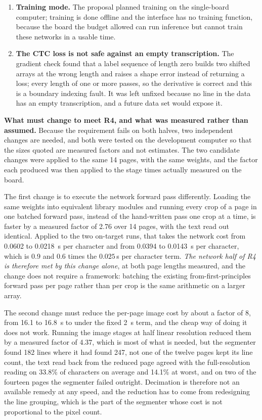 \begin{enumerate}
          \item \textbf{Training mode.} The proposal planned training on the single-board computer; training is done offline and the interface has no training function, because the board the budget allowed can run inference but cannot train these networks in a usable time.
          \item \textbf{The CTC loss is not safe against an empty transcription.} The gradient check found that a label sequence of length zero builds two shifted arrays at the wrong length and raises a shape error instead of returning a loss; every length of one or more passes, so the derivative is correct and this is a boundary indexing fault. It was left unfixed because no line in the data has an empty transcription, and a future data set would expose it.
        \end{enumerate}

        \textbf{What must change to meet R4, and what was measured rather than assumed.}
        Because the requirement fails on both halves, two independent changes are needed, and both were tested on the development computer so that the sizes quoted are measured factors and not estimates.
        The two candidate changes were applied to the same 14 pages, with the same weights, and the factor each produced was then applied to the stage times actually measured on the board.

        The first change is to execute the network forward pass differently.
        Loading the same weights into equivalent library modules and running every crop of a page in one batched forward pass, instead of the hand-written pass one crop at a time, is faster by a measured factor of 2.76 over 14 pages, with the text read out identical.
        Applied to the two on-target runs, that takes the network cost from 0.0602 to 0.0218~s per character and from 0.0394 to 0.0143~s per character, which is 0.9 and 0.6 times the $0.025\,$s per character term.
        \emph{The network half of R4 is therefore met by this change alone}, at both page lengths measured, and the change does not require a framework: batching the existing from-first-principles forward pass per page rather than per crop is the same arithmetic on a larger array.

        The second change must reduce the per-page image cost by about a factor of 8, from 16.1 to 16.8~s to under the fixed 2~s term, and the cheap way of doing it does not work.
        Running the image stages at half linear resolution reduced them by a measured factor of 4.37, which is most of what is needed, but the segmenter found 182 lines where it had found 247, not one of the twelve pages kept its line count, the text read back from the reduced page agreed with the full-resolution reading on 33.8\% of characters on average and 14.1\% at worst, and on two of the fourteen pages the segmenter failed outright.
        Decimation is therefore not an available remedy at any speed, and the reduction has to come from redesigning the line grouping, which is the part of the segmenter whose cost is not proportional to the pixel count.

